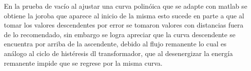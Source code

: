 \documentclass[11pt,letterpaper]{article}     %
\begin{document}
En la prueba de vacío al ajustar una curva polinóica que se adapte con matlab se obtiene la joroba que aparece al inicio de la misma esto sucede en parte a que al tomar los valores descendentes por error se tomaron valores con distancias fuera de lo recomendado, sin embargo se logra apreciar que la curva descendente se encuentra por arriba de la ascendente, debido al flujo remanente lo cual es análogo al ciclo de histéresis dl transformador, que al desenergizar la energía remanente impide que se regrese por la misma curva.\\

    
\end{document}
